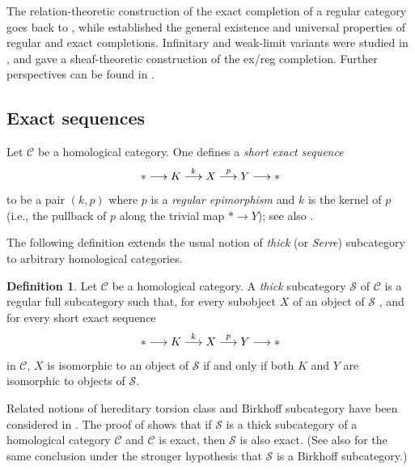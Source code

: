 \documentclass[12pt]{amsart}
\theoremstyle{definition}
\newtheorem{definition}[theorem]{Definition}
\begin{document}
The relation-theoretic construction of the exact completion of a regular
category goes back to \cite{succi_cruciani_teoria_1975}, while \cite%
{carboni_regular_1998} established the general existence and universal
properties of regular and exact completions. Infinitary and weak-limit
variants were studied in \cite{hu_note_1996}, and \cite{lack_note_1999} gave
a sheaf-theoretic construction of the ex/reg completion. Further
perspectives can be found in \cite%
{gran_semi-localizations_2016,garner_lex_2012,shulman_exact_2012}.

\subsection{Exact sequences}

Let $\mathcal{C}$ be a homological category. One defines a \emph{short exact
sequence}%
\begin{equation*}
\ast {}\longrightarrow K\overset{k}{\longrightarrow }X\overset{p}{%
\longrightarrow }Y\longrightarrow \ast
\end{equation*}%
to be a pair $\left( k,p\right) $ where $p$ is a \emph{regular epimorphism}
and $k$ is the kernel of $p$ (i.e., the pullback of $p$ along the trivial
map $\ast \rightarrow Y$); see also \cite%
{bourn_3_2001,bourn_torsion_2006,clementino_torsion_2006,gran_torsion_2007,bourn_baer_2007,janelidze_characterization_2007}%
.

The following definition extends the usual notion of \emph{thick} (or \emph{%
Serre}) subcategory \cite[Definition 8.3.21]{kashiwara_categories_2006} to
arbitrary homological categories.

\begin{definition}
\label{Definition:thick} Let $\mathcal{C}$ be a homological category. A 
\emph{thick} subcategory $\mathcal{S}$ of $\mathcal{C}$ is a regular full
subcategory such that, for every subobject $X$ of an object of $\mathcal{S}$%
, and for every short exact sequence%
\begin{equation*}
\ast {}\longrightarrow K\overset{k}{\longrightarrow }X\overset{p}{%
\longrightarrow }Y\longrightarrow \ast
\end{equation*}%
in $\mathcal{C}$, $X$ is isomorphic to an object of $\mathcal{S}$ if and
only if both $K$ and $Y$ are isomorphic to objects of $\mathcal{S}$.
\end{definition}

Related notions of hereditary torsion class and Birkhoff subcategory have
been considered in \cite%
{bourn_torsion_2006,clementino_torsion_2006,lopez_cafaggi_torsion_2022}. The
proof of \cite[Lemma 2.13]{lopez_cafaggi_torsion_2022} shows that if $%
\mathcal{S}$ is a thick subcategory of a homological category $\mathcal{C}$
and $\mathcal{C}$ is exact, then $\mathcal{S}$ is also exact. (See also \cite%
{everaert_baer_2004,janelidze_galois_1994} for the same conclusion under the
stronger hypothesis that $\mathcal{S}$ is a Birkhoff subcategory.)
\end{document}
